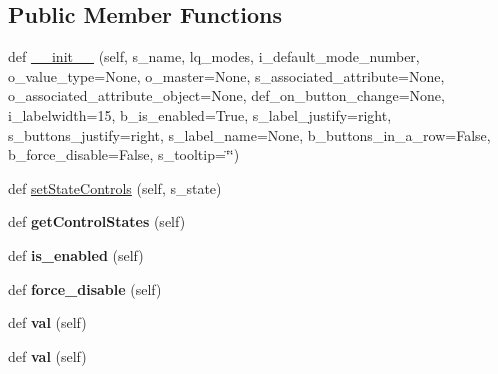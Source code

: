 \subsection*{Public Member Functions}
\begin{DoxyCompactItemize}
\item 
def \hyperlink{classnegui_1_1pgkeycategoricalvalueframe_1_1KeyCategoricalValueFrame_a2c9fb8441f73917f0a6f9af179c436ef}{\+\_\+\+\_\+init\+\_\+\+\_\+} (self, s\+\_\+name, lq\+\_\+modes, i\+\_\+default\+\_\+mode\+\_\+number, o\+\_\+value\+\_\+type=None, o\+\_\+master=None, s\+\_\+associated\+\_\+attribute=None, o\+\_\+associated\+\_\+attribute\+\_\+object=None, def\+\_\+on\+\_\+button\+\_\+change=None, i\+\_\+labelwidth=15, b\+\_\+is\+\_\+enabled=True, s\+\_\+label\+\_\+justify=\textquotesingle{}right\textquotesingle{}, s\+\_\+buttons\+\_\+justify=\textquotesingle{}right\textquotesingle{}, s\+\_\+label\+\_\+name=None, b\+\_\+buttons\+\_\+in\+\_\+a\+\_\+row=False, b\+\_\+force\+\_\+disable=False, s\+\_\+tooltip=\char`\"{}\char`\"{})
\item 
def \hyperlink{classnegui_1_1pgkeycategoricalvalueframe_1_1KeyCategoricalValueFrame_aff5c9286de1063277913c3274657f0bc}{set\+State\+Controls} (self, s\+\_\+state)
\item 
def {\bfseries get\+Control\+States} (self)\hypertarget{classnegui_1_1pgkeycategoricalvalueframe_1_1KeyCategoricalValueFrame_ac460db19a4cab594e44e35ec9dd7f64f}{}\label{classnegui_1_1pgkeycategoricalvalueframe_1_1KeyCategoricalValueFrame_ac460db19a4cab594e44e35ec9dd7f64f}

\item 
def {\bfseries is\+\_\+enabled} (self)\hypertarget{classnegui_1_1pgkeycategoricalvalueframe_1_1KeyCategoricalValueFrame_a89d7f62a48033e2bf1401795fc69ebc1}{}\label{classnegui_1_1pgkeycategoricalvalueframe_1_1KeyCategoricalValueFrame_a89d7f62a48033e2bf1401795fc69ebc1}

\item 
def {\bfseries force\+\_\+disable} (self)\hypertarget{classnegui_1_1pgkeycategoricalvalueframe_1_1KeyCategoricalValueFrame_a55d748475399ee7556e2eae72db69c38}{}\label{classnegui_1_1pgkeycategoricalvalueframe_1_1KeyCategoricalValueFrame_a55d748475399ee7556e2eae72db69c38}

\item 
def {\bfseries val} (self)\hypertarget{classnegui_1_1pgkeycategoricalvalueframe_1_1KeyCategoricalValueFrame_aa4259a98893ee65f1ec8e0f2f6bf3288}{}\label{classnegui_1_1pgkeycategoricalvalueframe_1_1KeyCategoricalValueFrame_aa4259a98893ee65f1ec8e0f2f6bf3288}

\item 
def {\bfseries val} (self)\hypertarget{classnegui_1_1pgkeycategoricalvalueframe_1_1KeyCategoricalValueFrame_aa4259a98893ee65f1ec8e0f2f6bf3288}{}\label{classnegui_1_1pgkeycategoricalvalueframe_1_1KeyCategoricalValueFrame_aa4259a98893ee65f1ec8e0f2f6bf3288}

\end{DoxyCompactItemize}
